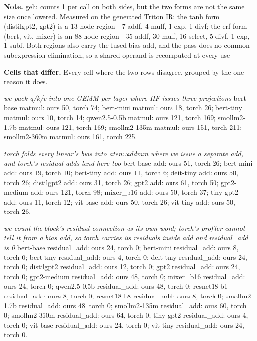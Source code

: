 \begin{minipage}{\linewidth}
\par\smallskip
\textbf{Note.} gelu counts 1 per call on both sides, but the two forms are not the same size once lowered. Measured on the generated Triton IR: the tanh form (distilgpt2, gpt2) is a 13-node region - 7 addf, 4 mulf, 1 exp, 1 divf; the erf form (bert, vit, mixer) is an 88-node region - 35 addf, 30 mulf, 16 select, 5 divf, 1 exp, 1 subf. Both regions also carry the fused bias add, and the pass does no common-subexpression elimination, so a shared operand is recomputed at every use
\par\smallskip
\textbf{Cells that differ.} Every cell where the two rows disagree, grouped by the one reason it does.
\par\smallskip
\emph{we pack q/k/v into one GEMM per layer where HF issues three projections} bert-base matmul: ours 50, torch 74; bert-mini matmul: ours 18, torch 26; bert-tiny matmul: ours 10, torch 14; qwen2.5-0.5b matmul: ours 121, torch 169; smollm2-1.7b matmul: ours 121, torch 169; smollm2-135m matmul: ours 151, torch 211; smollm2-360m matmul: ours 161, torch 225.
\par\smallskip
\emph{torch folds every linear's bias into aten::addmm where we issue a separate add, and torch's residual adds land here too} bert-base add: ours 51, torch 26; bert-mini add: ours 19, torch 10; bert-tiny add: ours 11, torch 6; deit-tiny add: ours 50, torch 26; distilgpt2 add: ours 31, torch 26; gpt2 add: ours 61, torch 50; gpt2-medium add: ours 121, torch 98; mixer\_b16 add: ours 50, torch 37; tiny-gpt2 add: ours 11, torch 12; vit-base add: ours 50, torch 26; vit-tiny add: ours 50, torch 26.
\par\smallskip
\emph{we count the block's residual connection as its own word; torch's profiler cannot tell it from a bias add, so torch carries its residuals inside add and residual\_add is 0} bert-base residual\_add: ours 24, torch 0; bert-mini residual\_add: ours 8, torch 0; bert-tiny residual\_add: ours 4, torch 0; deit-tiny residual\_add: ours 24, torch 0; distilgpt2 residual\_add: ours 12, torch 0; gpt2 residual\_add: ours 24, torch 0; gpt2-medium residual\_add: ours 48, torch 0; mixer\_b16 residual\_add: ours 24, torch 0; qwen2.5-0.5b residual\_add: ours 48, torch 0; resnet18-b1 residual\_add: ours 8, torch 0; resnet18-b8 residual\_add: ours 8, torch 0; smollm2-1.7b residual\_add: ours 48, torch 0; smollm2-135m residual\_add: ours 60, torch 0; smollm2-360m residual\_add: ours 64, torch 0; tiny-gpt2 residual\_add: ours 4, torch 0; vit-base residual\_add: ours 24, torch 0; vit-tiny residual\_add: ours 24, torch 0.

\end{minipage}
